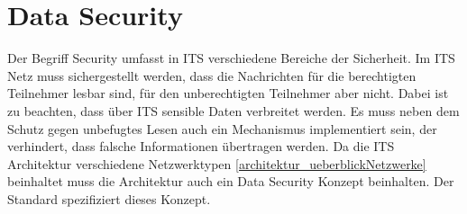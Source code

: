 \section{Data Security\label{architektur_dataSecurity}}
Der Begriff Security umfasst in \ac{ITS} verschiedene Bereiche der Sicherheit. Im \ac{ITS} Netz muss sichergestellt werden, dass die Nachrichten für die berechtigten Teilnehmer lesbar sind, für den unberechtigten Teilnehmer aber nicht. Dabei ist zu beachten, dass über \ac{ITS} sensible Daten verbreitet werden. Es muss neben dem Schutz gegen unbefugtes Lesen auch ein Mechanismus implementiert sein, der verhindert, dass falsche Informationen übertragen werden. Da die \ac{ITS} Architektur verschiedene Netzwerktypen \autoref{architektur_ueberblickNetzwerke} beinhaltet muss die Architektur auch ein Data Security Konzept beinhalten. Der Standard \cite{ts102940} spezifiziert dieses Konzept.  

